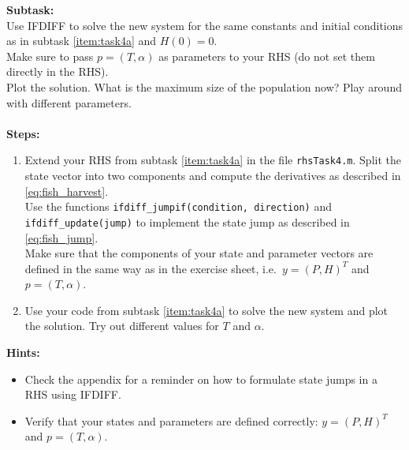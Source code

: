 \begin{enumerate}[label=\alph*)]
    \textbf{Subtask:} \\
    Use IFDIFF to solve the new system for the same constants and initial conditions as in subtask \ref{item:task4a} and $H(0) = 0$. \\
    Make sure to pass $p = (T, \alpha)$ as parameters to your RHS (do not set them directly in the RHS). \\
    Plot the solution. What is the maximum size of the population now? Play around with different parameters. \\ \\
    \textbf{Steps:}
    \begin{enumerate}[label=\arabic*.]
        \item Extend your RHS from subtask \ref{item:task4a} in the file \texttt{rhsTask4.m}. Split the state vector into two components and compute the derivatives as described in \cref{eq:fish_harvest}. \\
        Use the functions \lstinline|ifdiff_jumpif(condition, direction)| and \lstinline|ifdiff_update(jump)| to implement the state jump as described in \cref{eq:fish_jump}. \\
        Make sure that the components of your state and parameter vectors are defined in the same way as in the exercise sheet, i.e.~$y = (P, H)^T$ and $p = (T, \alpha)$.
        \item Use your code from subtask \ref{item:task4a} to solve the new system and plot the solution. Try out different values for $T$ and $\alpha$.
    \end{enumerate}
    \textbf{Hints:}
    \begin{itemize}
        \item Check the appendix for a reminder on how to formulate state jumps in a RHS using IFDIFF.
        \item Verify that your states and parameters are defined correctly: $y = (P, H)^T$ and $p = (T, \alpha)$.
    \end{itemize}


\end{enumerate}
